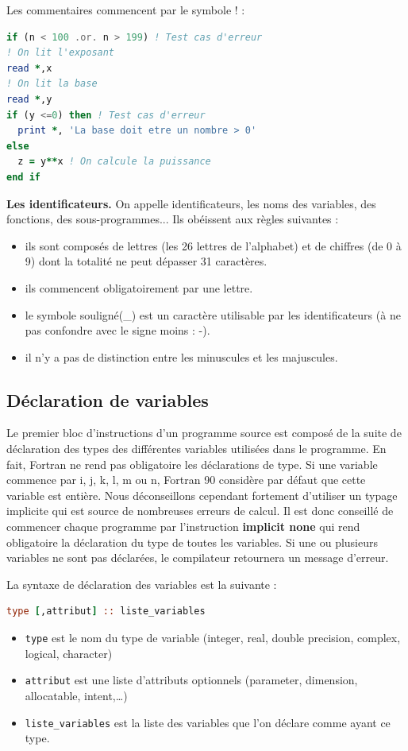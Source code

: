 \documentclass[a4paper,twoside]{article}
\begin{document}
Les commentaires commencent par le symbole \og ! \fg : 
\begin{lstlisting}[language=Fortran]
if (n < 100 .or. n > 199) ! Test cas d'erreur
! On lit l'exposant
read *,x 
! On lit la base
read *,y 
if (y <=0) then ! Test cas d'erreur 
  print *, 'La base doit etre un nombre > 0'
else 
  z = y**x ! On calcule la puissance
end if
\end{lstlisting}

\bigskip

\textbf{Les identificateurs.} On appelle identificateurs, les noms des variables, des fonctions, des
sous-programmes... Ils obéissent aux règles suivantes :
\begin{itemize}
\item ils sont composés de lettres (les 26 lettres de l'alphabet) et de chiffres (de 0 à 9) dont la totalité ne peut dépasser 31 caractères.
\item ils commencent obligatoirement par une lettre.
\item le symbole \og souligné\fg (\_) est un caractère utilisable par les identificateurs (à ne pas confondre avec le signe moins : \og -\fg).
\item il n'y a pas de distinction entre les minuscules et les majuscules.
\end{itemize}

\subsection{Déclaration de variables}
Le premier bloc d'instructions d'un programme source est composé de la suite de déclaration des types des différentes variables utilisées dans le programme. En fait, Fortran ne rend pas obligatoire les déclarations de type. Si une variable commence par i, j, k, l, m ou n, Fortran 90 considère par défaut que cette variable est entière. Nous déconseillons cependant fortement d'utiliser un typage implicite qui est source de nombreuses erreurs de calcul. Il est donc conseillé de commencer chaque programme par l'instruction \textbf{implicit none} qui rend obligatoire la déclaration du type de toutes les variables. Si une ou plusieurs variables ne sont pas déclarées, le compilateur retournera un message d'erreur.

La syntaxe de déclaration des variables est la suivante : 
\begin{lstlisting}[language=Fortran]
type [,attribut] :: liste_variables
\end{lstlisting}
\begin{itemize}
\item \texttt{type} est le nom du type de variable (integer, real, double precision, complex, logical, character)
\item \texttt{attribut} est une liste d'attributs optionnels (parameter, dimension, allocatable, intent,\dots)
\item \texttt{liste\_variables} est la liste des variables que l'on déclare comme ayant ce type.
\end{itemize}
\end{document}
